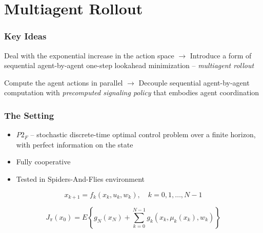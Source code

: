\documentclass{beamer}
\begin{document}
    \section{Multiagent Rollout}


    \begin{frame}
	\frametitle{Key Ideas}
	
	
        \begin{block}{Deal with the exponential increase in the action space}
	$\rightarrow$ Introduce a form of sequential
	agent-by-agent one-step lookahead minimization --
	\textit{multiagent rollout}
	
\end{block}

\begin{block}{Compute the agent actions in parallel}
	$\rightarrow$ Decouple sequential 
	agent-by-agent computation with \textit{precomputed
		signaling policy} that embodies agent coordination
\end{block}	
	
	

	\end{frame}





    \begin{frame}
        \frametitle{The Setting}
        
        \begin{itemize}
			\item $P2_F$ -- stochastic discrete-time optimal control problem over a finite horizon, with perfect information on the state
			\item Fully cooperative
			\item Tested in Spiders-And-Flies environment
		\end{itemize}
	
	$$x_{k+1}=f_{k}\left(x_{k}, u_{k}, w_{k}\right), \quad k=0,1, \ldots, N-1$$
	
	$$J_{\pi}\left(x_{0}\right)=E\left\{g_{N}\left(x_{N}\right)+\sum_{k=0}^{N-1} g_{k}\left(x_{k}, \mu_{k}\left(x_{k}\right), w_{k}\right)\right\}$$
	
	
    \end{frame}


\end{document}
